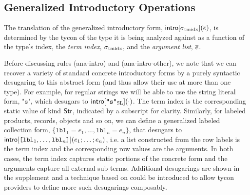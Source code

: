 \documentclass[10pt,preprint]{sigplanconf}
\begin{document}
\subsection{Generalized Introductory Operations}\label{sec:introop}
The translation of the generalized introductory form, ${\sf intro}[\sigma_\text{tmidx}](\overline{e})$, is determined by the tycon of the type it is being analyzed against as a function of the type's index, the \emph{term index}, $\sigma_\text{tmidx}$, and the \emph{argument list}, $\overline{e}$.

Before discussing rules (ana-intro) and (ana-intro-other), we note that we can recover a variety of standard concrete introductory forms by a purely syntactic desugaring to this abstract form (and thus allow their use at more than one type). For example, for regular strings we will be able to use the string literal form, $\texttt{"s"}$, which desugars to ${\sf intro}[\texttt{"s"}_\text{SL}](\cdot)$. The term index is the corresponding static value of kind ${\sf Str}$, indicated by a subscript for clarity. Similarly, for labeled products, records, objects and so on, we can define a generalized labeled collection form, $\{\mathtt{lbl}_1=e_1, \ldots, \mathtt{lbl}_n=e_n\}$, that desugars to ${\sf intro}[\texttt{[}\mathtt{lbl}_1, \ldots, \mathtt{lbl}_n\texttt{]}](e_1; \ldots; e_n)$, i.e. a list constructed from the row labels is the term index and the corresponding row values are the arguments. In both cases, the term index captures  static portions of the concrete form and the arguments capture all external sub-terms. Additional desugarings are shown in the supplement and a technique based on \cite{TSLs} could be introduced to allow tycon providers to define more such desugarings  composably. 
\end{document}
